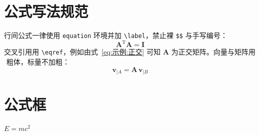 \section{公式写法规范}
行间公式一律使用 \texttt{equation} 环境并加 \texttt{\textbackslash label}，禁止裸 \texttt{\$\$} 与手写编号：
\begin{equation}
	\boldsymbol{A}^{\mathrm{T}}\boldsymbol{A}=\boldsymbol{I}
	\label{eq:示例:正交}
\end{equation}
交叉引用用 \texttt{\textbackslash eqref}，例如由式~\eqref{eq:示例:正交} 可知 $\boldsymbol{A}$ 为正交矩阵。向量与矩阵用 $\boldsymbol{}$ 粗体，标量不加粗：
\begin{equation}
	\boldsymbol{v}_{|A}=\boldsymbol{A}\,\boldsymbol{v}_{|B}
	\label{eq:示例:坐标变换}
\end{equation}

\section{公式框}
\begin{myformula}
	$E = mc^2$
\end{myformula}
